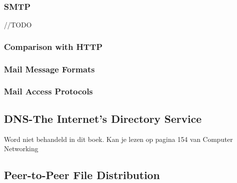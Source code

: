 \subsubsection{SMTP}
//TODO
\subsubsection{Comparison with HTTP}

\subsubsection{Mail Message Formats}

\subsubsection{Mail Access Protocols}

\subsection{DNS-The Internet's Directory Service}
Word niet behandeld in dit boek. Kan je lezen op pagina 154 van Computer Networking

\subsection{Peer-to-Peer File Distribution}
